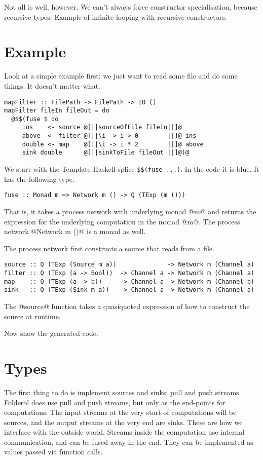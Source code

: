 Not all is well, however.
We can't always force constructor specialisation, because recursive types.
Example of infinite looping with recursive constructors.


\section{Example}

Look at a simple example first: we just want to read some file and do some things.
It doesn't matter what.
\begin{lstlisting}
mapFilter :: FilePath -> FilePath -> IO ()
mapFilter fileIn fileOut = do
  @$$(fuse $ do
     ins    <- source @[||sourceOfFile fileIn||]@
     above  <- filter @[||\i -> i > 0        ||]@ ins
     double <- map    @[||\i -> i * 2        ||]@ above
     sink double      @[||sinkToFile fileOut ||]@)@
\end{lstlisting}

We start with the Template Haskell splice \verb/$$(fuse ...)/. In the code it is blue. 
It has the following type.
\begin{lstlisting}
fuse :: Monad m => Network m () -> Q (TExp (m ()))
\end{lstlisting}
That is, it takes a process network with underlying monad @m@ and returns the expression for the underlying computation in the monad @m@.
The process network @Network m ()@ is a monad as well.

The process network first constructs a source that reads from a file.
\begin{lstlisting}
source :: Q (TExp (Source m a))              -> Network m (Channel a)
filter :: Q (TExp (a -> Bool))  -> Channel a -> Network m (Channel a)
map    :: Q (TExp (a -> b))     -> Channel a -> Network m (Channel b)
sink   :: Q (TExp (Sink m a))   -> Channel a -> Network m (Channel a)
\end{lstlisting}
The @source@ function takes a quasiquoted expression of how to construct the source at runtime.

Now show the generated code.

\section{Types}
The first thing to do is implement sources and sinks: pull and push streams.
Folderol does use pull and push streams, but only as the end-points for computations.
The input streams at the very start of computations will be sources, and the output streams at the very end are sinks.
These are how we interface with the outside world.
Streams inside the computation use internal communication, and can be fused away in the end. They can be implemented as values passed via function calls.

